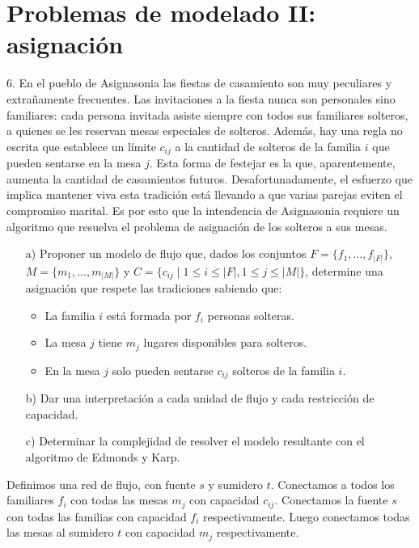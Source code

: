 \documentclass{article}
\begin{document}
\section*{Problemas de modelado II: asignación}

6. En el pueblo de Asignasonia las fiestas de casamiento son muy peculiares y extrañamente frecuentes. Las invitaciones a la fiesta nunca son personales sino familiares: cada persona invitada asiste siempre con todos sus familiares solteros, a quienes se les reservan mesas especiales de solteros. Además, hay una regla no escrita que establece un límite \( c_{ij} \) a la cantidad de solteros de la familia \( i \) que pueden sentarse en la mesa \( j \). Esta forma de festejar es la que, aparentemente, aumenta la cantidad de casamientos futuros. Desafortunadamente, el esfuerzo que implica mantener viva esta tradición está llevando a que varias parejas eviten el compromiso marital. Es por esto que la intendencia de Asignasonia requiere un algoritmo que resuelva el problema de asignación de los solteros a sus mesas.

\begin{enumerate}
    \item[a)] Proponer un modelo de flujo que, dados los conjuntos \( F = \{f_1, \ldots, f_{|F|}\} \), \( M = \{m_1, \ldots, m_{|M|}\} \) y \( C = \{c_{ij} \mid 1 \leq i \leq |F|, 1 \leq j \leq |M|\} \), determine una asignación que respete las tradiciones sabiendo que:
    \begin{itemize}
        \item La familia \( i \) está formada por \( f_i \) personas solteras.
        \item La mesa \( j \) tiene \( m_j \) lugares disponibles para solteros.
        \item En la mesa \( j \) solo pueden sentarse \( c_{ij} \) solteros de la familia \( i \).
    \end{itemize}
    
    \item[b)] Dar una interpretación a cada unidad de flujo y cada restricción de capacidad.
    
    \item[c)] Determinar la complejidad de resolver el modelo resultante con el algoritmo de Edmonds y Karp.
\end{enumerate}

Definimos una red de flujo, con fuente \( s \) y sumidero \( t \). Conectamos a todos los familiares \( f_i \) con todas las mesas \( m_j \) con capacidad \( c_{ij} \). Conectamos la fuente \( s \) con todas las familias con capacidad \( f_i \) respectivamente. Luego conectamos todas las mesas al sumidero \( t \) con capacidad \( m_j \) respectivamente.
\end{document}
